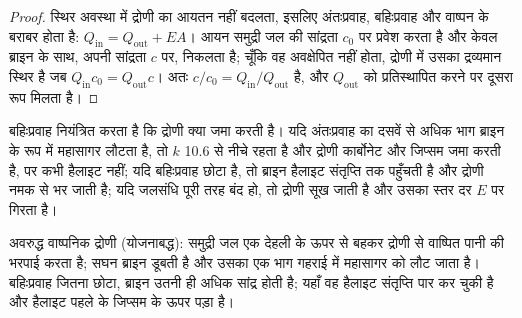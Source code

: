 \begin{proof}
स्थिर अवस्था में द्रोणी का आयतन नहीं बदलता, इसलिए अंतःप्रवाह, बहिःप्रवाह और वाष्पन के बराबर होता है: $Q_{\mathrm{in}} = Q_{\mathrm{out}} +
EA$। आयन समुद्री जल की सांद्रता $c_0$ पर प्रवेश करता है और केवल ब्राइन के साथ, अपनी सांद्रता $c$ पर, निकलता है; चूँकि वह अवक्षेपित नहीं होता, द्रोणी में उसका द्रव्यमान स्थिर है जब $Q_{\mathrm{in}}c_0 = Q_{\mathrm{out}}c$। अतः $c/c_0 =
Q_{\mathrm{in}}/Q_{\mathrm{out}}$ है, और $Q_{\mathrm{out}}$ को प्रतिस्थापित करने पर दूसरा रूप मिलता है।
\end{proof}

बहिःप्रवाह नियंत्रित करता है कि द्रोणी क्या जमा करती है। यदि अंतःप्रवाह का दसवें से अधिक भाग ब्राइन के रूप में महासागर लौटता है, तो $k$ 10.6 से नीचे रहता है और द्रोणी कार्बोनेट और जिप्सम जमा करती है, पर कभी हैलाइट नहीं; यदि बहिःप्रवाह छोटा है, तो ब्राइन हैलाइट संतृप्ति तक पहुँचती है और द्रोणी नमक से भर जाती है; यदि जलसंधि पूरी तरह बंद हो, तो द्रोणी सूख जाती है और उसका स्तर दर $E$ पर गिरता है।

\begin{omfigure}

{\small अवरुद्ध वाष्पनिक द्रोणी (योजनाबद्ध): समुद्री जल एक देहली के ऊपर से बहकर द्रोणी से वाष्पित पानी की भरपाई करता है; सघन ब्राइन डूबती है और उसका एक भाग गहराई में महासागर को लौट जाता है। बहिःप्रवाह जितना छोटा, ब्राइन उतनी ही अधिक सांद्र होती है; यहाँ वह हैलाइट संतृप्ति पार कर चुकी है और हैलाइट पहले के जिप्सम के ऊपर पड़ा है।}
\label{fig:b1:chemical-biogenic-sediments:barred}
\end{omfigure}

